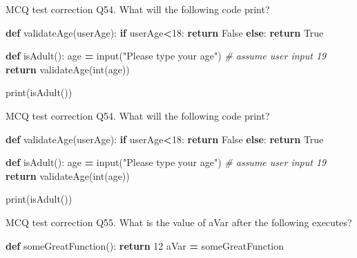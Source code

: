 \documentclass[
  8pt,
  ignorenonframetext,
]{beamer}
\newenvironment{Shaded}{\begin{snugshade}}{\end{snugshade}}
\newcommand{\BuiltInTok}[1]{#1}
\newcommand{\CommentTok}[1]{\textcolor[rgb]{0.56,0.35,0.01}{\textit{#1}}}
\newcommand{\ControlFlowTok}[1]{\textcolor[rgb]{0.13,0.29,0.53}{\textbf{#1}}}
\newcommand{\DecValTok}[1]{\textcolor[rgb]{0.00,0.00,0.81}{#1}}
\newcommand{\KeywordTok}[1]{\textcolor[rgb]{0.13,0.29,0.53}{\textbf{#1}}}
\newcommand{\NormalTok}[1]{#1}
\newcommand{\OperatorTok}[1]{\textcolor[rgb]{0.81,0.36,0.00}{\textbf{#1}}}
\newcommand{\StringTok}[1]{\textcolor[rgb]{0.31,0.60,0.02}{#1}}
\newcommand{\VariableTok}[1]{\textcolor[rgb]{0.00,0.00,0.00}{#1}}
\begin{document}
\begin{frame}[fragile]{MCQ test correction}
\protect\hypertarget{mcq-test-correction-106}{}
Q54. What will the following code print?

\begin{Shaded}
\begin{Highlighting}[]
\KeywordTok{def}\NormalTok{ validateAge(userAge):}
    \ControlFlowTok{if}\NormalTok{ userAge}\OperatorTok{\textless{}}\DecValTok{18}\NormalTok{:}
        \ControlFlowTok{return} \VariableTok{False}
    \ControlFlowTok{else}\NormalTok{:}
        \ControlFlowTok{return} \VariableTok{True}

\KeywordTok{def}\NormalTok{ isAdult():}
\NormalTok{    age }\OperatorTok{=} \BuiltInTok{input}\NormalTok{(}\StringTok{"Please type your age"}\NormalTok{) }\CommentTok{\# assume user input 19}
    \ControlFlowTok{return}\NormalTok{ validateAge(}\BuiltInTok{int}\NormalTok{(age))}

\BuiltInTok{print}\NormalTok{(isAdult())}
\end{Highlighting}
\end{Shaded}
\end{frame}

\begin{frame}[fragile]{MCQ test correction}
\protect\hypertarget{mcq-test-correction-107}{}
Q54. What will the following code print?

\begin{Shaded}
\begin{Highlighting}[]
\KeywordTok{def}\NormalTok{ validateAge(userAge):}
    \ControlFlowTok{if}\NormalTok{ userAge}\OperatorTok{\textless{}}\DecValTok{18}\NormalTok{:}
        \ControlFlowTok{return} \VariableTok{False}
    \ControlFlowTok{else}\NormalTok{:}
        \ControlFlowTok{return} \VariableTok{True}

\KeywordTok{def}\NormalTok{ isAdult():}
\NormalTok{    age }\OperatorTok{=} \BuiltInTok{input}\NormalTok{(}\StringTok{"Please type your age"}\NormalTok{) }\CommentTok{\# assume user input 19}
    \ControlFlowTok{return}\NormalTok{ validateAge(}\BuiltInTok{int}\NormalTok{(age))}

\BuiltInTok{print}\NormalTok{(isAdult())}
\end{Highlighting}
\end{Shaded}
\end{frame}

\begin{frame}[fragile]{MCQ test correction}
\protect\hypertarget{mcq-test-correction-108}{}
Q55. What is the value of aVar after the following executes?

\begin{Shaded}
\begin{Highlighting}[]
\KeywordTok{def}\NormalTok{ someGreatFunction():}
    \ControlFlowTok{return} \DecValTok{12}
\NormalTok{aVar }\OperatorTok{=}\NormalTok{ someGreatFunction}
\end{Highlighting}
\end{Shaded}
\end{frame}
\end{document}
